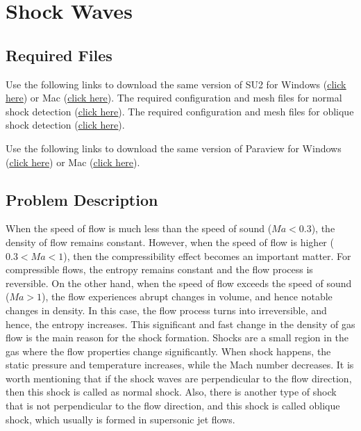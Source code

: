 \chapter{Shock Waves}
\label{ch:Shock Waves}
\section{Required Files}
\begin{su2note}
	Use the following links to download the same version of SU2 for Windows (\href{https://users.encs.concordia.ca/~bvermeir/book/executables/windows/SU2_Windows.zip}{\underline{click here}}) or Mac (\href{https://users.encs.concordia.ca/~bvermeir/book/executables/osx/SU2_Mac.zip}{\underline{click here}}).
	The required configuration and mesh files for normal shock detection (\href{https://gitlab.com/bvermeir/book-cfd/blob/master/tutorial/tut7_shock_wave/normal_shock.zip}{\underline{click here}}).
	The required configuration and mesh files for oblique shock detection (\href{https://gitlab.com/bvermeir/book-cfd/blob/master/tutorial/tut7_shock_wave/oblique_shock.zip}{\underline{click here}}).	
\end{su2note}
\begin{paraviewnote}
	Use the following links to download the same version of Paraview for Windows (\href{https://users.encs.concordia.ca/~bvermeir/book/executables/windows/ParaView-5.4.0-Qt5-OpenGL2-Windows-64bit.exe}{\underline{click here}}) or Mac (\href{https://users.encs.concordia.ca/~bvermeir/book/executables/osx/ParaView-5.4.0-Qt5-OpenGL2-MPI-OSX10.8-64bit.dmg}{\underline{click here}}).
\end{paraviewnote}


\section{Problem Description}
When the speed of flow is much less than the speed of sound ($Ma<0.3$), the density of flow remains constant. However, when the speed of flow is higher ($0.3<Ma<1$), then the compressibility effect becomes an important matter. For compressible flows, the entropy remains constant and the flow process is reversible. On the other hand, when the speed of flow exceeds the speed of sound ($Ma>1$), the flow experiences abrupt changes in volume, and hence notable changes in density. In this case, the flow process turns into irreversible,  and hence, the entropy increases. This significant and fast change in the density of gas flow is the main reason for the shock formation. Shocks are a small region in the gas where the flow properties change significantly. When shock happens, the static pressure and temperature increases, while the Mach number decreases. It is worth mentioning that if the shock waves are perpendicular to the flow direction, then this shock is called as normal shock. Also, there is another type of shock that is not perpendicular to the flow direction, and this shock is called oblique shock, which usually is formed in supersonic jet flows.

